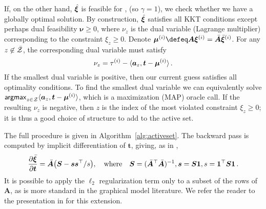 If, on the other hand, $\hat{\bm{\xi}}$ is feasible for ,
(so $\gamma=1$),
we check whether we have a globally optimal solution.
By construction, $\hat{\bm{\xi}}$ satisfies all KKT
conditions except perhaps dual feasibility $\bm{\nu} \geq 0$,
where $\nu_z$ is the dual variable (Lagrange multiplier) corresponding to the
constraint $\xi_z \geq 0$.
Denote $\bm{\mu}^{(i)} \defeq \bm{A}\pv^{(i)} = \bar{\bm{A}}\bar{\pv}^{(i)}$.
For any $z \not\in \bar{\mathcal{Z}}$, the corresponding dual variable must satisfy
%
\begin{equation}\label{eq:dual}
    \nu_z = \tau^{(i)} - \langle\bm{a}_z,\bm{t} - \bm{\mu}^{(i)}\rangle\,.
\end{equation}
%
If the smallest dual variable is positive, then our current guess satisfies all
optimality conditions. To find the smallest dual variable we can equivalently
solve $\operatorname*{\mathsf{argmax}}_{z \in \mathcal{Z}} \langle\bm{a}_z,\bm{t} - \bm{\mu}^{(i)}\rangle$, which is
a maximization (MAP) oracle call. If the resulting $\nu_z$ is negative,
then $z$ is the index of the most violated constraint $\xi_z \geq 0$;
it is thus a good choice of structure to add to the active set.

The full procedure is given in Algorithm~\ref{alg:activeset}.
The backward pass is computed by implicit differentiation of  \wrt
$\bm{t}$, giving, as in \cite{sparsemap},
\begin{equation}
    \frac{\partial \bar{\bm{\xi}}}{\partial \bm{t}} = \bar{\bm{A}}\big(\bm{S} - \bm{ss}^\top / s\big),
    \quad\text{where}\quad
    \bm{S} = (\bar{\bm{A}}^\top \bar{\bm{A}})^{-1},
    \bm{s} = \bm{S1}, s = \bm{1}^\top\bm{S1}
    \,.
\end{equation}
It is possible to apply the $\ell_2$ regularization term only to a subset of the
rows of $\bm{A}$, as is more standard in the graphical model literature. We
refer the reader to the presentation in \cite{ad3,sparsemap} for this extension.

